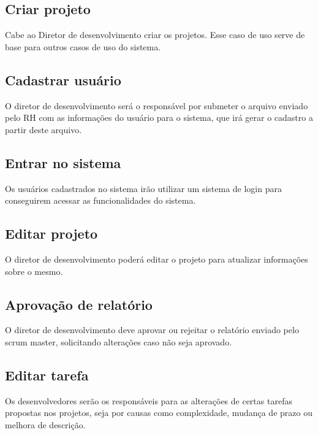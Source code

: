 \subsection{Criar projeto}
  Cabe ao Diretor de desenvolvimento criar os projetos. Esse caso de uso serve de base para outros casos de uso do sistema.
\subsection{Cadastrar usuário}
O diretor de desenvolvimento será o responsável por submeter o arquivo enviado pelo RH com as informações do usuário para o sistema, que irá gerar o cadastro a partir deste arquivo.
\subsection{Entrar no sistema}
  Os usuários cadastrados no sistema irão utilizar um sistema de login para conseguirem acessar as funcionalidades do sistema.
\subsection{Editar projeto}
O diretor de desenvolvimento poderá editar o projeto para atualizar informações sobre o mesmo.
\subsection{Aprovação de relatório}
O diretor de desenvolvimento deve aprovar ou rejeitar o relatório enviado  pelo scrum master, solicitando alterações caso não seja aprovado.
\subsection{Editar tarefa}
  Os desenvolvedores serão os responsáveis para as alterações de certas tarefas propostas nos projetos, seja por causas como complexidade, mudança de prazo ou melhora de descrição.
